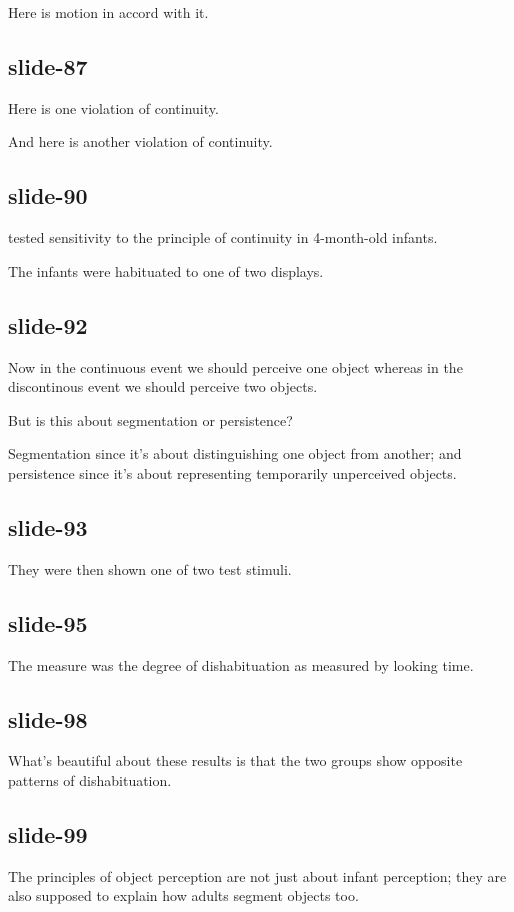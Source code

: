 \documentclass[12pt,\papersize]{extarticle}
\begin{document}
Here is motion in accord with it.
 
\subsection{slide-87}
Here is one violation of continuity.
 
And here is another violation of continuity.
 
\subsection{slide-90}
\citet{spelke:1995_spatiotemporal} tested sensitivity to the principle of continuity in 4-month-old infants.
 
The infants were habituated to one of two displays.
 
\subsection{slide-92}
Now in the continuous event we should perceive one object whereas in the discontinous event we should perceive two objects.
 
But is this about segmentation or persistence?
 
Segmentation since it's about distinguishing one object from another; 
           and persistence since it's about representing temporarily unperceived objects.
 
\subsection{slide-93}
They were then shown one of two test stimuli.
 
\subsection{slide-95}
The measure was the degree of dishabituation as measured by looking time.
 
\subsection{slide-98}
What's beautiful about these results is that the two groups show opposite patterns of dishabituation.
 
\subsection{slide-99}
The principles of object perception are not just about infant perception; they are also supposed to explain how adults segment objects too.
 
\end{document}
